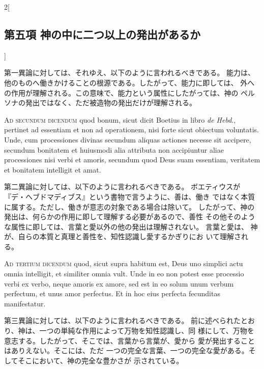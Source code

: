 \documentclass[paper=a4paper,fontsize=10pt,jafontsize=9pt,titlepage]{jlreq}
\begin{document}
\begin{paracol}{2}[\subsection{第五項 神の中に二つ以上の発出があるか}]
\switchcolumn


第一異論に対しては、それゆえ、以下のように言われるべきである。
能力は、他のものへ働きかけることの根源である。したがって、能力に即しては、
 外への作用が理解される。この意味で、能力という属性にしたがっては、神の
 ペルソナの発出ではなく、ただ被造物の発出だけが理解される。


\switchcolumn*[\subsection{ad.2}]


{\scshape Ad secundum dicendum} quod bonum, sicut dicit Boetius in libro {\itshape de Hebd}.,
 pertinet ad essentiam et non ad operationem, nisi forte sicut obiectum
 voluntatis. Unde, cum processiones divinas secundum aliquas actiones
 necesse sit accipere, secundum bonitatem et huiusmodi alia attributa
 non accipiuntur aliae processiones nisi verbi et amoris, secundum quod
 Deus suam essentiam, veritatem et bonitatem intelligit et amat.


\switchcolumn


第二異論に対しては、以下のように言われるべきである。
ボエティウスが『デ・ヘブドマディブス』という書物で言うように、善は、働き
 ではなく本質に属する。ただし、働きが意志の対象である場合は除いて。
したがって、神の発出は、何らかの作用に即して理解する必要があるので、善性
 その他そのような属性に即しては、言葉と愛以外の他の発出は理解されない。
言葉と愛は、 神が、自らの本質と真理と善性を、知性認識し愛するかぎりにお
 いて理解される。


\switchcolumn*[\subsection{ad.3}]


{\scshape Ad tertium dicendum} quod, sicut supra habitum est, Deus uno simplici
 actu omnia intelligit, et similiter omnia vult. Unde in eo non potest
 esse processio verbi ex verbo, neque amoris ex amore, sed est in eo
 solum unum verbum perfectum, et unus amor perfectus. Et in hoc eius
 perfecta fecunditas manifestatur.


\switchcolumn


第三異論に対しては、以下のように言われるべきである。
前に述べられたとおり、神は、一つの単純な作用によって万物を知性認識し、同
 様にして、万物を意志する。したがって、そこでは、言葉から言葉が、愛から
 愛が発出することはありえない。そこには、ただ
一つの完全な言葉、一つの完全な愛がある。そしてそこにおいて、神の完全な豊かさが
 示されている。


\switchcolumn*



\end{paracol}
\end{document}
